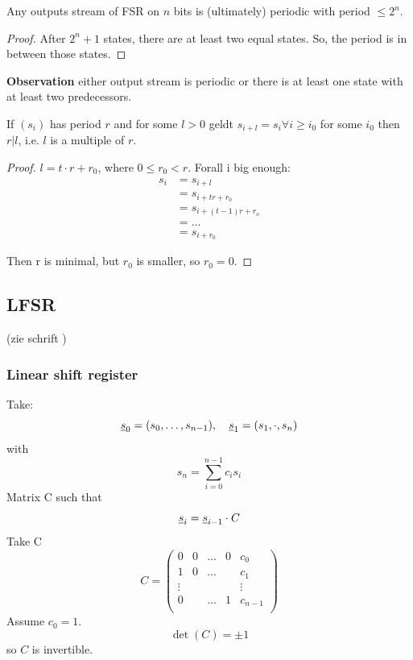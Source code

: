 \documentclass[language=english,number=]{homework}
\begin{document}
\begin{theorem}
Any outputs stream of FSR on $n$ bits is (ultimately) periodic with period $\le 2^n$.
\end{theorem}
\begin{proof}
After $2^{n}+1$ states, there are at least two equal states.
So, the period is in between those states.
\end{proof}

\textbf{Observation} either output stream is periodic or there is at least one state with at least two predecessors.

\begin{theorem}
If $(s_i)$ has period $r$ and for some $l > 0$ geldt $s_{i+l} = s_i \forall i \ge i_0$ for some $i_0$ then $r | l$, i.e. $l$ is a multiple of $r$.
\end{theorem}
\begin{proof}
$l = t \cdot r + r_0$, where $0 \le r_0 < r$.
Forall i big enough:
\begin{align*}
s_i &= s_{i+l} \\
&= s_{i+tr + r_0} \\
&= s_{i + (t-1)r + r_o} \\
&= \dots \\
&= s_{i+r_0}
\end{align*}

Then r is minimal, but $r_0$ is smaller, so $r_0 = 0$.
\end{proof}

\subsection{LFSR}

(zie schrift )

\subsubsection{Linear shift register}
Take:
\[
\underline{s}_0 = (s_0, \dots, s_{n-1}), \quad \underline{s}_1 = (s_1, \cdot, s_{n})
\]
with
\[
s_n = \sum_{i=0}^{n-1} c_i s_i
\]
Matrix C such that
\[
\underline{s}_i = \underline{s}_{i-1} \cdot C
\]
Take C
\[
C = \begin{pmatrix}
0 & 0 & \dots & 0 & c_0 \\
1 & 0 & \dots & & c_1 \\
\vdots & & & & \vdots \\
0 & & \dots & 1 & c_{n-1} \\
\end{pmatrix}
\]
Assume $c_0 = 1$.
\[
\det(C) = \pm 1
\]
so $C$ is invertible.
\end{document}
